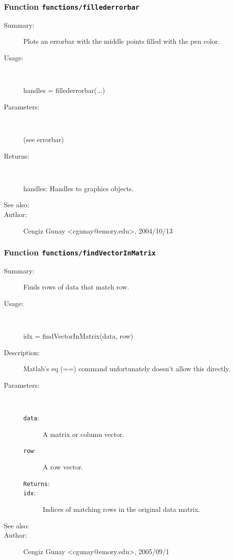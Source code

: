 \subsubsection[Function \texttt{fillederrorbar}]{Function \texttt{functions/fillederrorbar}}%
%
\label{ref_functions__fillederrorbar}%
\hypertarget{ref_functions__fillederrorbar}{}%
\begin{description}
\item[Summary:]Plots an errorbar with the middle points filled with the pen color.
%
\item[Usage:]~%
\begin{lyxcode}%
handles = fillederrorbar(...)
%
\end{lyxcode}%
%
%
\item[Parameters:]~

(see errorbar)%
\item[Returns:]~

	handles: Handles to graphics objects.
%
%
\item[See also:]%
%
\item[Author:]%
Cengiz Gunay <cgunay@emory.edu>, 2004/10/13%
\end{description}
\methodline%
\subsubsection[Function \texttt{findVectorInMatrix}]{Function \texttt{functions/findVectorInMatrix}}%
%
\label{ref_functions__findVectorInMatrix}%
\hypertarget{ref_functions__findVectorInMatrix}{}%
\begin{description}
\item[Summary:]Finds rows of data that match row.
%
\item[Usage:]~%
\begin{lyxcode}%
idx = findVectorInMatrix(data, row)
%
\end{lyxcode}%
%
\item[Description:]%
Matlab's eq (==) command unfortunately doesn't allow this directly.
\item[Parameters:]~
\begin{description}%
\item[\texttt{data}:]
 A matrix or column vector.
\item[\texttt{row}:]
 A row vector.
\item[\texttt{Returns}:]

\item[\texttt{idx}:]
 Indices of matching rows in the original data matrix.
\end{description}%
%
%
%
\item[See also:]%
%
\item[Author:]%
Cengiz Gunay <cgunay@emory.edu>, 2005/09/1%
\end{description}
\methodline%
